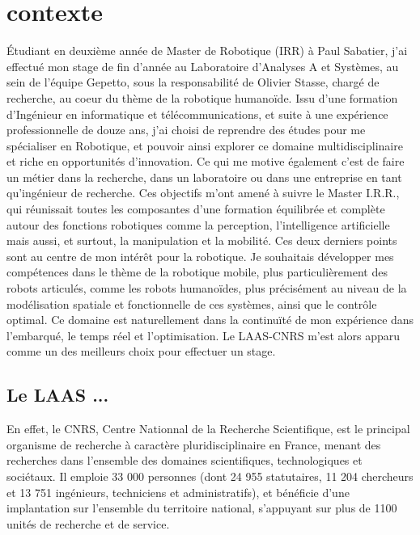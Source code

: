 \documentclass{report}
\begin{document}
\section*{contexte}

\'{E}tudiant en deuxième année de Master de Robotique (IRR) à Paul Sabatier, j'ai effectué mon stage de fin d'année au Laboratoire d'Analyses A et Systèmes, au sein de l'équipe Gepetto, sous la responsabilité de Olivier Stasse, chargé de recherche, au coeur du thème de la robotique humanoïde. Issu d'une formation d'Ingénieur en informatique et télécommunications, et suite à une expérience professionnelle de douze ans, j'ai choisi de reprendre des études pour me spécialiser en Robotique, et pouvoir ainsi explorer ce domaine multidisciplinaire et riche en opportunités d'innovation. Ce qui me motive également c'est de faire un métier dans la recherche, dans un laboratoire ou dans une entreprise en tant qu'ingénieur de recherche. Ces objectifs m'ont amené à suivre le Master I.R.R., qui réunissait toutes les composantes d'une formation équilibrée et complète autour des fonctions robotiques comme la perception, l'intelligence artificielle mais aussi, et surtout, la manipulation et la mobilité. Ces deux derniers points sont au centre de mon intérêt pour la robotique. Je souhaitais développer mes compétences dans le thème de la robotique mobile, plus particulièrement des robots articulés, comme les robots humanoïdes, plus précisément au niveau de la modélisation spatiale et fonctionnelle de ces systèmes, ainsi que le contrôle optimal. Ce domaine est naturellement dans la continuïté de mon expérience dans l'embarqué, le temps réel et l'optimisation. Le LAAS-CNRS m'est alors apparu comme un des meilleurs choix pour effectuer un stage.

\subsection*{Le LAAS ...}
En effet, le CNRS, Centre Nationnal de la Recherche Scientifique, est le principal organisme de recherche à caractère pluridisciplinaire en France, menant des recherches dans l'ensemble des domaines scientifiques, technologiques et sociétaux. Il emploie 33 000 personnes (dont 24 955 statutaires, 11 204 chercheurs et 13 751 ingénieurs, techniciens et administratifs), et bénéficie d'une implantation sur l'ensemble du territoire national, s'appuyant sur plus de 1100 unités de recherche et de service.
\end{document}
